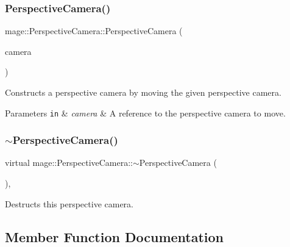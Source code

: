 \subsubsection{\texorpdfstring{Perspective\+Camera()}{PerspectiveCamera()}\hspace{0.1cm}{\footnotesize\ttfamily [4/4]}}
{\footnotesize\ttfamily mage\+::\+Perspective\+Camera\+::\+Perspective\+Camera (\begin{DoxyParamCaption}\item[{\hyperlink{classmage_1_1_perspective_camera}{Perspective\+Camera} \&\&}]{camera }\end{DoxyParamCaption})\hspace{0.3cm}{\ttfamily [default]}}

Constructs a perspective camera by moving the given perspective camera.


\begin{DoxyParams}[1]{Parameters}
\mbox{\tt in}  & {\em camera} & A reference to the perspective camera to move. \\
\hline
\end{DoxyParams}
\hypertarget{classmage_1_1_perspective_camera_a119a77c3f14072040231845e9a894af2}{}\label{classmage_1_1_perspective_camera_a119a77c3f14072040231845e9a894af2} 
\subsubsection{\texorpdfstring{$\sim$\+Perspective\+Camera()}{~PerspectiveCamera()}}
{\footnotesize\ttfamily virtual mage\+::\+Perspective\+Camera\+::$\sim$\+Perspective\+Camera (\begin{DoxyParamCaption}{ }\end{DoxyParamCaption})\hspace{0.3cm}{\ttfamily [virtual]}, {\ttfamily [default]}}

Destructs this perspective camera. 

\subsection{Member Function Documentation}
\hypertarget{classmage_1_1_perspective_camera_ab660d9ee76631d7758662aa1a163acfe}{}\label{classmage_1_1_perspective_camera_ab660d9ee76631d7758662aa1a163acfe} 
